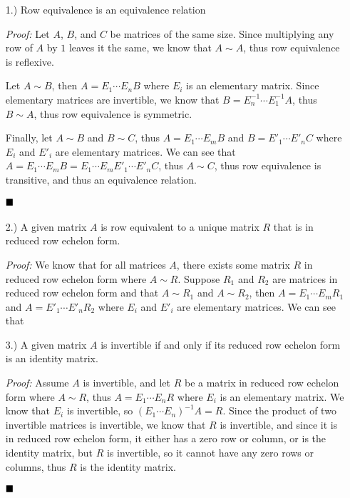 \documentclass[12pt]{article}
\newcommand{\done}{
    \ensuremath{\strut\hfill\blacksquare}
}
\begin{document}
    \begin{itemize}
        \item [1.)] Row equivalence is an equivalence relation
        
        \textit{Proof:} Let $A$, $B$, and $C$ be matrices of the same size.
        Since multiplying any row of $A$ by $1$ leaves it the same, we know
        that $A\sim A$, thus row equivalence is reflexive.

        Let $A\sim B$, then $A=E_1\cdots E_nB$ where $E_i$ is an elementary
        matrix.
        Since elementary matrices are invertible, we know that
        $B=E^{-1}_n\cdots E^{-1}_1A$, thus $B\sim A$, thus row equivalence
        is symmetric.

        Finally, let $A\sim B$ and $B\sim C$, thus $A=E_1\cdots E_mB$ and
        $B=E'_1\cdots E'_nC$ where $E_i$ and $E'_i$ are elementary matrices.
        We can see that $A=E_1\cdots E_mB=E_1\cdots E_mE'_1\cdots E'_nC$, thus
        $A\sim C$, thus row equivalence is transitive, and thus an equivalence
        relation.
        \done

        \item [2.)] A given matrix $A$ is row equivalent to a unique matrix
        $R$ that is in reduced row echelon form.

        \textit{Proof:} We know that for all matrices $A$, there exists some
        matrix $R$ in reduced row echelon form where $A \sim R$.
        Suppose $R_1$ and $R_2$ are matrices in reduced row echelon form
        and that $A \sim R_1$ and $A \sim R_2$, then $A = E_1 \cdots E_mR_1$ and
        $A=E'_1 \cdots E'_nR_2$ where $E_i$ and $E'_i$ are elementary matrices.
        We can see that

        \item [3.)] A given matrix $A$ is invertible if and only if its
        reduced row echelon form is an identity matrix.

        \textit{Proof:} Assume $A$ is invertible, and let $R$ be a matrix in
        reduced row echelon form where $A \sim R$, thus $A = E_1 \cdots E_nR$
        where $E_i$ is an elementary matrix.
        We know that $E_i$ is invertible, so $(E_1 \cdots E_n)^{-1}A=R$.
        Since the product of two invertible matrices is invertible, we know
        that $R$ is invertible, and since it is in reduced row echelon form,
        it either has a zero row or column, or is the identity matrix, but $R$
        is invertible, so it cannot have any zero rows or columns, thus $R$ is
        the identity matrix.
        \done

    \end{itemize}
    
\end{document}
